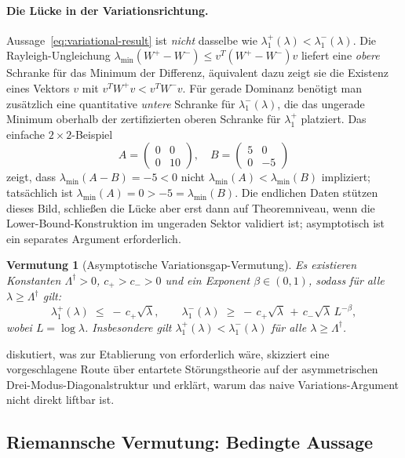 \documentclass[11pt,a4paper]{article}
\theoremstyle{remark}
\theoremstyle{plain}
\newtheorem{conjecture}[conjecture]{Vermutung}
\begin{document}
\paragraph{Die Lücke in der Variationsrichtung.}
Aussage~\eqref{eq:variational-result} ist \emph{nicht} dasselbe wie $\lambda_1^+(\lambda)<\lambda_1^-(\lambda)$. Die Rayleigh-Ungleichung $\lambda_{\min}(W^+-W^-)\leq v^T(W^+-W^-)v$ liefert eine \emph{obere} Schranke für das Minimum der Differenz, äquivalent dazu zeigt sie die Existenz eines Vektors $v$ mit $v^TW^+v<v^TW^-v$. Für gerade Dominanz benötigt man zusätzlich eine quantitative \emph{untere} Schranke für $\lambda_1^-(\lambda)$, die das ungerade Minimum oberhalb der zertifizierten oberen Schranke für $\lambda_1^+$ platziert. Das einfache $2\times 2$-Beispiel
\[
  A=\begin{pmatrix}0&0\\0&10\end{pmatrix},\quad
  B=\begin{pmatrix}5&0\\0&-5\end{pmatrix}
\]
zeigt, dass $\lambda_{\min}(A-B)=-5<0$ nicht $\lambda_{\min}(A)<\lambda_{\min}(B)$ impliziert; tatsächlich ist $\lambda_{\min}(A)=0>-5=\lambda_{\min}(B)$. Die endlichen Daten stützen dieses Bild, schließen die Lücke aber erst dann auf Theoremniveau, wenn die Lower-Bound-Konstruktion im ungeraden Sektor validiert ist; asymptotisch ist ein separates Argument erforderlich.

\begin{conjecture}[Asymptotische Variationsgap-Vermutung]
\label{conj:avg}
Es existieren Konstanten $\Lambda^\dagger>0$, $c_+>c_->0$ und ein Exponent $\beta\in(0,1)$, sodass für alle $\lambda\geq\Lambda^\dagger$ gilt:
\[
  \lambda_1^+(\lambda) \;\leq\; -\,c_+\sqrt\lambda,
  \qquad
  \lambda_1^-(\lambda) \;\geq\; -\,c_+\sqrt\lambda \,+\, c_-\sqrt\lambda\,L^{-\beta},
\]
wobei $L=\log\lambda$. Insbesondere gilt $\lambda_1^+(\lambda)<\lambda_1^-(\lambda)$ für alle $\lambda\geq\Lambda^\dagger$.
\end{conjecture}

 diskutiert, was zur Etablierung von  erforderlich wäre, skizziert eine vorgeschlagene Route über entartete Störungstheorie auf der asymmetrischen Drei-Modus-Diagonalstruktur und erklärt, warum das naive Variations-Argument nicht direkt liftbar ist.

\subsection{Riemannsche Vermutung: Bedingte Aussage}
\end{document}
